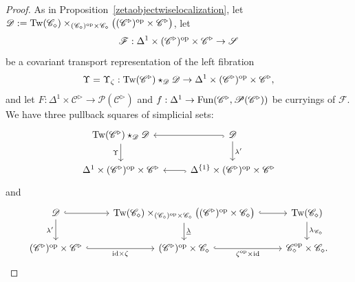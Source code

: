 \documentclass{tac}
\newcommand{\s}[1]{\mathscr{#1}}
\newcommand{\tx}[1]{\textnormal{#1}}
\newcommand{\ul}[1]{\underline{#1}}
\begin{document}
\begin{proof}
As in Proposition~\ref{zetaobjectwiselocalization}, let $\s{D} := \tx{Tw}(\s{C}_\diamond) \times_{ (\s{C}_\diamond )^\tx{op} \times \s{C}_\diamond} \big( (\s{C}^\triangleright )^\tx{op}\times \s{C}^\triangleright \big)$, let \[\s{F}: \Delta^1 \times (\s{C}^\triangleright )^\tx{op} \times \s{C}^\triangleright \to \s{S}\] be a covariant transport representation of the left fibration 
\[\Upsilon = \Upsilon_{\zeta} : \tx{Tw}(\s{C}^\triangleright )\star_{\s{D}} \s{D} \to \Delta^1 \times (\s{C}^\triangleright )^\tx{op} \times \s{C}^\triangleright , \]
and let $F : \Delta^1 \times \s{C}^\triangleright \to \s{P}(\s{C}^\triangleright )$ and $f : \Delta^1 \to \tx{Fun}(  \s{C}^\triangleright , \s{P}(\s{C}^\triangleright ) ) $ be curryings of $\s{F}$. We have three pullback squares of simplicial sets:
\[\begin{tikzcd} \tx{Tw}(\s{C}^\triangleright )\star_{\s{D}} \s{D} \arrow[]{d}[swap]{\Upsilon} & \s{D} \arrow[]{d}{\lambda'} \arrow[hook]{l} \\
\Delta^1 \times (\s{C}^\triangleright )^\tx{op} \times \s{C}^\triangleright & \Delta^{\{1\}} \times (\s{C}^\triangleright )^\tx{op} \times \s{C}^\triangleright  \arrow[hook]{l} \end{tikzcd}\]
and
\[\begin{tikzcd} 
\s{D}  \arrow[]{d}[swap]{\lambda'}  \arrow[hook]{r}  & \tx{Tw}(\s{C}_\diamond )\times_{ (\s{C}_\diamond )^\tx{op} \times \s{C}_\diamond} \big( (\s{C}^\triangleright )^\tx{op}\times \s{C}_\diamond \big) \arrow[]{d}{\ul{\lambda}}  \arrow[hook]{r} & \tx{Tw}(\s{C}_\diamond ) \arrow[]{d}{\lambda_{\s{C}_\diamond}} \\
 (\s{C}^\triangleright )^\tx{op} \times \s{C}^\triangleright  \arrow[hook]{r}[swap]{\tx{id} \times \zeta}  &  (\s{C}^\triangleright )^\tx{op} \times \s{C}_\diamond   \arrow[hook]{r}[swap]{\zeta^\tx{op} \times \tx{id}} &  \s{C}_\diamond^\tx{op} \times \s{C}_\diamond .  \end{tikzcd}\]

\end{proof}
\end{document}
